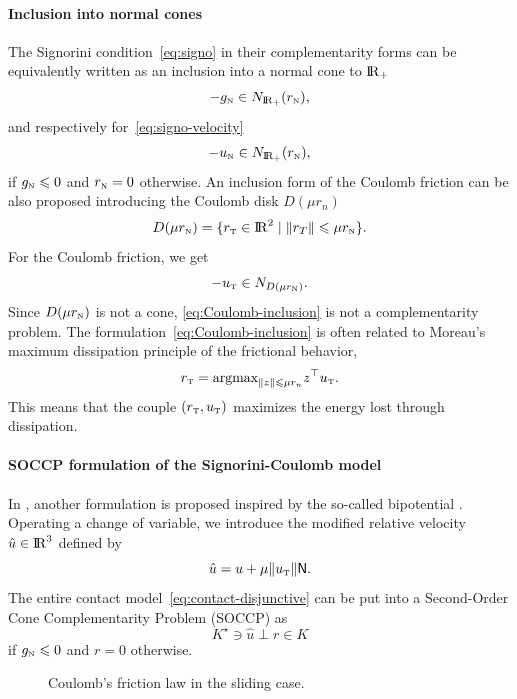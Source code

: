 \paragraph{Inclusion into normal cones} The Signorini condition~\eqref{eq:signo} in their complementarity forms can be equivalently written  as an inclusion into a normal cone to $\mathrm{I\!R}_+$
\begin{equation}
  \label{eq:signo-inclusion}
  - g_\n \in N_{\RR_+}(r_\n),
\end{equation}
and respectively for~\eqref{eq:signo-velocity}
\begin{equation}
  \label{eq:signo-inclusion-velo}
  - u_\n \in N_{\RR_+}(r_\n),
\end{equation}
if $g_{{\hbox{\tiny{N}}}} \leqslant 0$ and $r_{\hbox{\tiny{N}}} =0 $ otherwise. An inclusion form of the Coulomb friction can be also proposed introducing the Coulomb disk $D(\mu r_n)$
\begin{equation}
  \label{eq:diskR}
  D(\mu r_\n) = \{r_\t \in \RR^2\mid \|r_T\| \leq \mu r_\n   \}.
\end{equation}
For the Coulomb friction, we get
\begin{equation}
  \label{eq:Coulomb-inclusion}
  - u_{\t} \in N_{D(\mu r_\n)}.
\end{equation}
Since $D(\mu r_{\hbox{\tiny{N}}})$ is not a cone, \eqref{eq:Coulomb-inclusion} is not a complementarity problem.  The formulation~\eqref{eq:Coulomb-inclusion} is often related to Moreau's maximum dissipation principle of the frictional behavior,
\begin{equation}
  \label{eq:moreau-maxprinciple}
  r_\t = \mbox{argmax}_{\|z\| \leq \mu r_n}  z^\top u_\t.
\end{equation}
This means that the couple $(r_{\hbox{\tiny{T}}},u_{\hbox{\tiny{T}}})$ maximizes the energy lost through dissipation.


\paragraph{SOCCP formulation of the Signorini-Coulomb model}

In \cite{Acary.Brogliato2008,Acary.ea_ZAMM2011}, another formulation is proposed inspired by the so-called bipotential \cite{DeSaxce92,DeSaxce.Feng90,DeSaxce.Feng_MCM1998}. Operating a change of variable, we introduce the modified relative velocity $\hat u \in \mathrm{I\!R}^3$ defined by
\begin{equation}
  \label{eq:modified-velocity}
  \hat u = u +\mu \|u_\t\| \sf N.
\end{equation}
The entire contact model~\eqref{eq:contact-disjunctive} can be put into a Second-Order Cone Complementarity Problem (SOCCP) as
\begin{equation}
  \label{eq:contact-SOCCP}
 K^\star \ni \hat u \perp r \in K
\end{equation}
 if $ g_{\hbox{\tiny{N}}} \leqslant 0 $ and $r=0$ otherwise. 
\begin{figure}\centering
  \resizebox{!}{0.5\textheight}{}
  \caption{Coulomb's friction law in the sliding case.}
\label{fig:CoulombLawSliding}
\end{figure}

